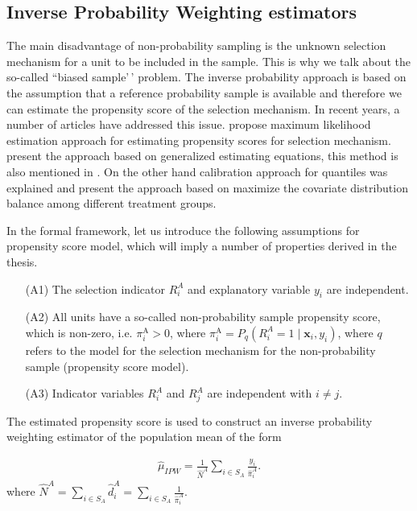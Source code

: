 \documentclass[
]{jss}
\begin{document}
\hypertarget{inverse-probability-weighting-estimators}{%
\subsection{Inverse Probability Weighting
estimators}\label{inverse-probability-weighting-estimators}}

The main disadvantage of non-probability sampling is the unknown
selection mechanism for a unit to be included in the sample. This is why
we talk about the so-called ``biased sample'\,' problem. The inverse
probability approach is based on the assumption that a reference
probability sample is available and therefore we can estimate the
propensity score of the selection mechanism. In recent years, a number
of articles have addressed this issue. \citet{chen2020doubly} propose
maximum likelihood estimation approach for estimating propensity scores
for selection mechanism. \citet{wu2022statistical} present the approach
based on generalized estimating equations, this method is also mentioned
in \citet{yang_doubly_2020}. On the other hand calibration approach for
quantiles was explained \citet{beresewicz2024inference} and
\citet{santanna_covariate_2022} present the approach based on maximize
the covariate distribution balance among different treatment groups.

In the formal framework, let us introduce the following assumptions for
propensity score model, which will imply a number of properties derived
in the thesis.

\begin{itemize}
    \item[(A1)] The selection indicator $R_i^A$ and explanatory variable $y_i$ are independent.
    \item[(A2)]All units have a so-called non-probability sample propensity score, which is non-zero, i.e. $\pi_i^{\mathrm{A}} > 0$, where $\pi_i^{\mathrm{A}} = P_q\left(R_i^A=1 \mid \boldsymbol{x}_i, y_i\right)$, where $q$ refers to the model for the selection mechanism for the non-probability sample (propensity score model).
    \item[(A3)] Indicator variables $R_i^A$ and $R_j^A$ are independent with $i \neq j$. 
\end{itemize}

The estimated propensity score is used to construct an inverse
probability weighting estimator of the population mean of the form

\begin{equation}
\begin{gathered}
\hat{\mu}_{I P W}=\frac{1}{\hat{N}^A} \sum_{i \in S_A} \frac{y_i}{\hat{\pi}_i^A}.
\end{gathered}
\end{equation} where
\(\hat{N}^A = \sum_{i \in S_A} \hat{d}_i^A = \sum_{i \in S_A} \frac{1}{\hat{\pi}_i^A}\).
\end{document}
